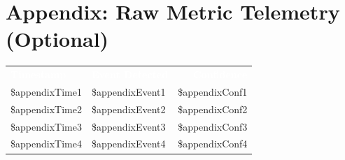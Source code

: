 \documentclass[11pt,a4paper]{article}
\begin{document}
\newpage
\section*{Appendix: Raw Metric Telemetry (Optional)}

\begin{small}
\renewcommand{\arraystretch}{1.5}
\begin{tabularx}{\textwidth}{@{} l X r @{}}
  \rowcolor{WiseThemeBg}
  \textcolor{white}{\textbf{Timestamp}} & \textcolor{white}{\textbf{Event Detected}} & \textcolor{white}{\textbf{Confidence}} \\
  \rowcolor{WiseLight}
  \${appendixTime1} & \${appendixEvent1} & \${appendixConf1} \\
  \rowcolor{WiseLight}
  \${appendixTime2} & \${appendixEvent2} & \${appendixConf2} \\
  \rowcolor{WiseLight}
  \${appendixTime3} & \${appendixEvent3} & \${appendixConf3} \\
  \${appendixTime4} & \${appendixEvent4} & \${appendixConf4} \\
  \bottomrule
\end{tabularx}
\end{small}
\end{document}
